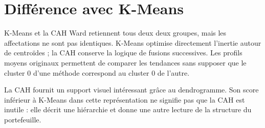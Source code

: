 \section{Différence avec K-Means}
K-Means et la CAH Ward retiennent tous deux deux groupes, mais les affectations ne sont pas identiques. K-Means optimise directement l'inertie autour de centroïdes ; la CAH conserve la logique de fusions successives. Les profils moyens originaux permettent de comparer les tendances sans supposer que le cluster 0 d'une méthode correspond au cluster 0 de l'autre.

La CAH fournit un support visuel intéressant grâce au dendrogramme. Son score inférieur à K-Means dans cette représentation ne signifie pas que la CAH est inutile : elle décrit une hiérarchie et donne une autre lecture de la structure du portefeuille.
